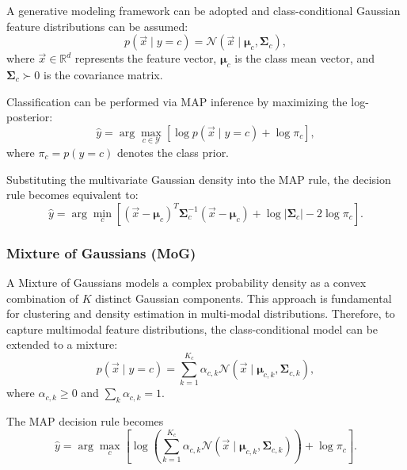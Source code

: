 A generative modeling framework can be adopted and class-conditional Gaussian feature distributions can be assumed:
\begin{equation}
	p(\vec{x} \mid y=c)
	=
	\mathcal{N}(\vec{x} \mid \boldsymbol{\mu}_c, \boldsymbol{\Sigma}_c),
\end{equation}
where $\vec{x} \in \mathbb{R}^d$ represents the feature vector, $\boldsymbol{\mu}_c$ is the class mean vector, and $\boldsymbol{\Sigma}_c \succ 0$ is the covariance matrix.

Classification can be performed via MAP inference by maximizing the log-posterior:
\begin{equation}
	\hat{y}
	=
	\arg\max_{c \in \mathcal{Y}}
	\left[
	\log p(\vec{x} \mid y=c) + \log \pi_c
	\right],
\end{equation}
where $\pi_c = p(y=c)$ denotes the class prior.

Substituting the multivariate Gaussian density into the MAP rule, the decision rule becomes equivalent to:
\begin{equation}
	\hat{y}
	=
	\arg\min_{c}
	\left[
	(\vec{x}-\boldsymbol{\mu}_c)^T
	\boldsymbol{\Sigma}_c^{-1}
	(\vec{x}-\boldsymbol{\mu}_c)
	+
	\log |\boldsymbol{\Sigma}_c|
	-
	2\log \pi_c
	\right].
\end{equation}

\subsubsection{Mixture of Gaussians (MoG)}

A Mixture of Gaussians models a complex probability density as a convex combination of $K$ distinct Gaussian components. This approach is fundamental for clustering and density estimation in multi-modal distributions. Therefore, to capture multimodal feature distributions, the class-conditional model can be extended to a mixture:
\begin{equation}
	p(\vec{x} \mid y=c)
	=
	\sum_{k=1}^{K_c}
	\alpha_{c,k}
	\mathcal{N}(\vec{x} \mid \boldsymbol{\mu}_{c,k}, \boldsymbol{\Sigma}_{c,k}),
\end{equation}
where $\alpha_{c,k} \ge 0$ and $\sum_k \alpha_{c,k} = 1$.

The MAP decision rule becomes
\begin{equation}
	\hat{y}
	=
	\arg\max_c
	\left[
	\log
	\left(
	\sum_{k=1}^{K_c}
	\alpha_{c,k}
	\mathcal{N}(\vec{x} \mid \boldsymbol{\mu}_{c,k}, \boldsymbol{\Sigma}_{c,k})
	\right)
	+
	\log \pi_c
	\right].
\end{equation}

